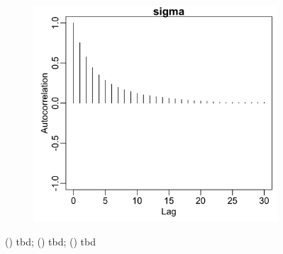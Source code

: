 \documentclass{uwstat572}
\begin{document}
\begin{figure}[H]
\begin{subfigure}[b]{0.49\textwidth}
		\includegraphics[width=\textwidth]{figures/mcmc_acf_plot_sigma.png}
		\caption{}
		\label{fig:acf_sigma}
	\end{subfigure}
	\caption{() tbd; () tbd; () tbd }
	\label{fig:diagnostics_sigma}
\end{figure} 
\end{document}
